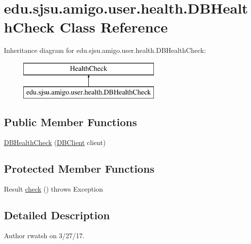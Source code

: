 \hypertarget{classedu_1_1sjsu_1_1amigo_1_1user_1_1health_1_1_d_b_health_check}{}\section{edu.\+sjsu.\+amigo.\+user.\+health.\+D\+B\+Health\+Check Class Reference}
\label{classedu_1_1sjsu_1_1amigo_1_1user_1_1health_1_1_d_b_health_check}
Inheritance diagram for edu.\+sjsu.\+amigo.\+user.\+health.\+D\+B\+Health\+Check\+:\begin{figure}[H]
\begin{center}
\leavevmode
\includegraphics[height=2.000000cm]{classedu_1_1sjsu_1_1amigo_1_1user_1_1health_1_1_d_b_health_check}
\end{center}
\end{figure}
\subsection*{Public Member Functions}
\begin{DoxyCompactItemize}
\item 
\hyperlink{classedu_1_1sjsu_1_1amigo_1_1user_1_1health_1_1_d_b_health_check_a2a817c00e9fb06042c84818bdd7438cb}{D\+B\+Health\+Check} (\hyperlink{interfaceedu_1_1sjsu_1_1amigo_1_1db_1_1common_1_1_d_b_client}{D\+B\+Client} client)
\end{DoxyCompactItemize}
\subsection*{Protected Member Functions}
\begin{DoxyCompactItemize}
\item 
Result \hyperlink{classedu_1_1sjsu_1_1amigo_1_1user_1_1health_1_1_d_b_health_check_af973493774013b4c929867e80e03a6e5}{check} ()  throws Exception 
\end{DoxyCompactItemize}


\subsection{Detailed Description}
\begin{DoxyAuthor}{Author}
rwatsh on 3/27/17. 
\end{DoxyAuthor}


